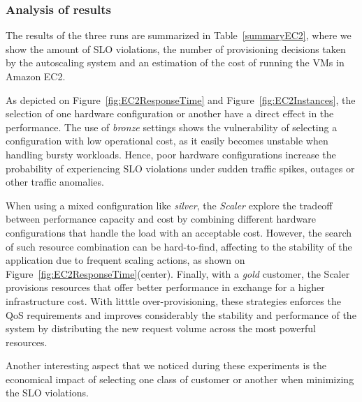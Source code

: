 \subsubsection{Analysis of results}
The results of the three runs are summarized in Table~\ref{summaryEC2}, where we show the amount of SLO violations, the number of provisioning decisions taken by the autoscaling system and an estimation of the cost of running the VMs in Amazon EC2.

As depicted on Figure~\ref{fig:EC2ResponseTime} and Figure~\ref{fig:EC2Instances}, the selection of one hardware configuration or another have a direct effect in the performance. The use of \emph{bronze} settings shows the vulnerability of selecting a configuration with low operational cost, as it easily becomes unstable when handling bursty workloads. Hence, poor hardware configurations increase the probability of experiencing SLO violations under sudden traffic spikes, outages or other traffic anomalies. 

When using a mixed configuration like \emph{silver}, the \emph{Scaler} explore the tradeoff between performance capacity and cost by combining different hardware configurations that handle the load with an acceptable cost. However, the search of such resource combination can be hard-to-find, affecting to the stability of the application due to frequent scaling actions, as shown on Figure~\ref{fig:EC2ResponseTime}(center). Finally, with a \emph{gold} customer, the Scaler provisions resources that offer better performance in exchange for a higher infrastructure cost. With litttle over-provisioning, these strategies enforces the QoS requirements and improves considerably the stability and performance of the system by distributing the new request volume across the most powerful resources.  

Another interesting aspect that we noticed during these experiments is the economical impact of selecting one class of customer or another when minimizing the SLO violations.






